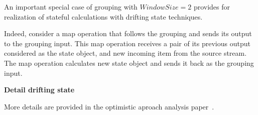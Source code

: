 An important special case of grouping with $Window Size = 2$  provides for realization of stateful calculations with drifting state techniques.  

Indeed, consider a map operation that follows the grouping and sends its output to the grouping input. This map operation receives a pair of its previous output considered as the state object, and new incoming item from the source stream. The map operation calculates new state object and sends it back as the grouping input. 

{\bf Detail drifting state}

More details are provided in the optimistic aproach analysis paper~\cite{we2018seim}.
